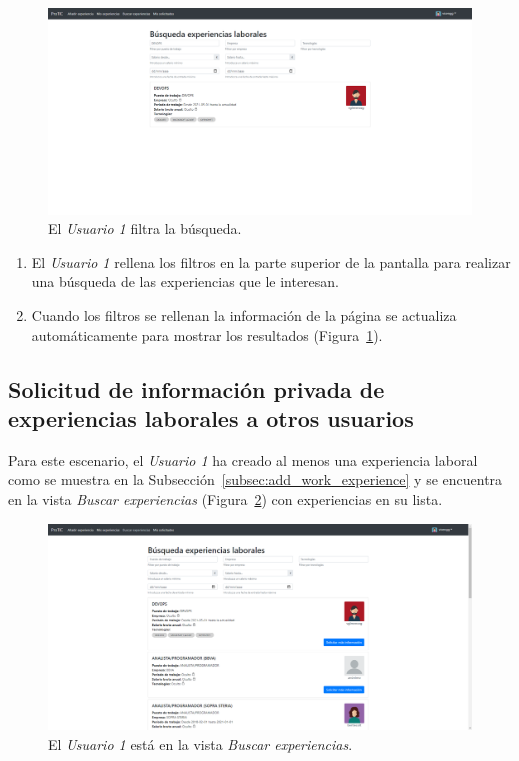 \documentclass[a4paper, 12pt]{book}
\begin{document}
    \begin{figure}
        \centering
        \includegraphics[width=15cm, keepaspectratio]{img/4.2.png}
        \caption{El \emph{Usuario 1} filtra la búsqueda.}
        \label{fig:use_cases_4_2}
    \end{figure}

    \begin{enumerate}
        \item El \emph{Usuario 1} rellena los filtros en la parte superior de la pantalla para realizar
        una búsqueda de las experiencias que le interesan.
        \item Cuando los filtros se rellenan la información de la página se actualiza automáticamente
        para mostrar los resultados (Figura~\ref{fig:use_cases_4_2}).
    \end{enumerate}

    \subsection{Solicitud de información privada de experiencias laborales a otros usuarios}
    \label{subsec:search_work_experiences}
    Para este escenario, el \emph{Usuario 1} ha creado al menos una experiencia laboral como se muestra en la Subsección~\ref{subsec:add_work_experience}
    y se encuentra en la vista \emph{Buscar experiencias} (Figura~\ref{fig:use_cases_5_1}) con experiencias en su lista.

    \begin{figure}
        \centering
        \includegraphics[width=15cm, keepaspectratio]{img/5.1.png}
        \caption{El \emph{Usuario 1} está en la vista \emph{Buscar experiencias}.}
        \label{fig:use_cases_5_1}
    \end{figure}
\end{document}
